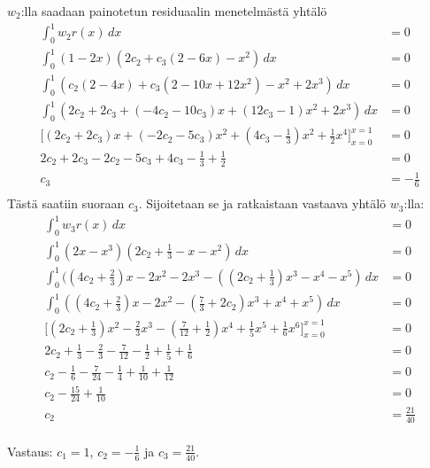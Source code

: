 \documentclass{article}
\begin{document}
$w_2$:lla saadaan painotetun residuaalin menetelmästä yhtälö
\begin{align*}
  \int_0^1 w_2r(x)\,dx &= 0 \\
  \int_0^1 (1-2x)(2c_2 + c_3(2 - 6x) - x^2)\,dx &= 0 \\
  \int_0^1 (c_2(2 - 4x) + c_3(2 - 10x + 12x^2) - x^2 + 2x^3) \,dx &= 0 \\
  \int_0^1 (2c_2 + 2c_3 + (-4c_2 - 10c_3)x + (12c_3 - 1)x^2 + 2x^3)\,dx &= 0 \\
  \Big[(2c_2 + 2c_3)x + (-2c_2 - 5c_3)x^2 + (4c_3 - \frac{1}{3})x^2 + \frac{1}{2}x^4\Big]_{x=0}^{x=1} &= 0 \\
  2c_2 + 2c_3 - 2c_2 - 5c_3 + 4c_3 - \frac{1}{3} + \frac{1}{2} &= 0 \\
  c_3 &= -\frac{1}{6} \\
\end{align*}
Tästä saatiin suoraan $c_3$. Sijoitetaan se ja ratkaistaan vastaava yhtälö $w_3$:lla:
\begin{align*}
  \int_0^1 w_3r(x)\,dx &= 0 \\
  \int_0^1 (2x - x^3)(2c_2 + \frac{1}{3} - x - x^2)\,dx &= 0 \\
  \int_0^1 ((4c_2 + \frac{2}{3})x - 2x^2 - 2x^3 - ((2c_2 + \frac{1}{3})x^3 - x^4 - x^5)\,dx &= 0 \\
  \int_0^1 ((4c_2 + \frac{2}{3})x - 2x^2 - (\frac{7}{3} + 2c_2)x^3 + x^4 + x^5)\,dx &= 0 \\
  \Big[(2c_2 + \frac{1}{3})x^2 - \frac{2}{3}x^3 - (\frac{7}{12} + \frac{1}{2})x^4
      + \frac{1}{5}x^5 + \frac{1}{6}x^6\Big]_{x=0}^{x=1} &= 0 \\
  2c_2 + \frac{1}{3} - \frac{2}{3} - \frac{7}{12} - \frac{1}{2} + \frac{1}{5} + \frac{1}{6} &= 0 \\
  c_2 - \frac{1}{6} - \frac{7}{24} - \frac{1}{4} + \frac{1}{10} + \frac{1}{12} &= 0 \\
  c_2 - \frac{15}{24} + \frac{1}{10} &= 0 \\
  c_2 &= \frac{21}{40} \\
\end{align*}

Vastaus: $c_1 = 1$, $c_2 = -\frac{1}{6}$ ja $c_3 = \frac{21}{40}$.
\end{document}
